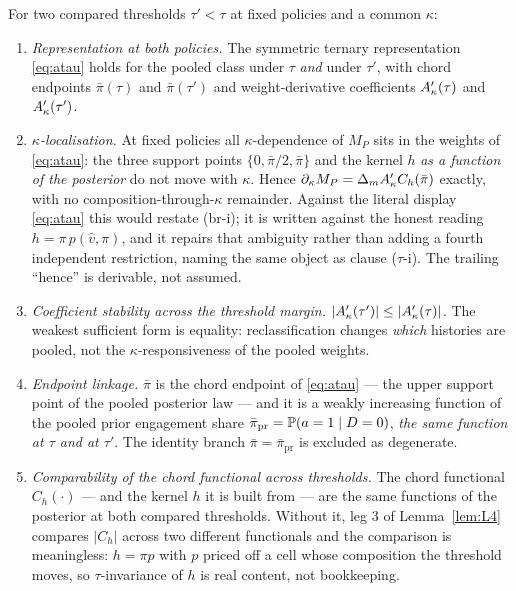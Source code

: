 \begin{assumption}
\label{asm:Abr}
For two compared thresholds $\tau' < \tau$ at fixed policies and a common $\kappa$:
\begin{enumerate}[label=(br-\roman*),leftmargin=3.2em,itemsep=3pt]
\item \emph{Representation at both policies.} The symmetric ternary representation \eqref{eq:atau}
  holds for the pooled class under $\tau$ \emph{and} under $\tau'$, with chord endpoints
  $\bar\pi(\tau)$ and $\bar\pi(\tau')$ and weight-derivative coefficients $A'_{\kappa}(\tau)$ and
  $A'_{\kappa}(\tau')$.
\item \emph{$\kappa$-localisation.} At fixed policies all $\kappa$-dependence of $M_P$ sits in the
  weights of \eqref{eq:atau}: the three support points $\{0,\bar\pi/2,\bar\pi\}$ and the kernel $h$
  \emph{as a function of the posterior} do not move with $\kappa$. Hence
  $\partial_\kappa M_P = \Delta_m A'_{\kappa} C_h(\bar\pi)$ exactly, with no
  composition-through-$\kappa$ remainder. Against the literal display \eqref{eq:atau} this would
  restate (br-i); it is written against the honest reading $h = \pi\,p(\hat v,\pi)$, and it repairs
  that ambiguity rather than adding a fourth independent restriction, naming the same object as
  clause ($\tau$-i). The trailing ``hence'' is derivable, not assumed.
\item \emph{Coefficient stability across the threshold margin.}
  $|A'_{\kappa}(\tau')| \le |A'_{\kappa}(\tau)|$. The weakest sufficient form is equality: reclassification
  changes \emph{which} histories are pooled, not the $\kappa$-responsiveness of the pooled weights.
\item \emph{Endpoint linkage.} $\bar\pi$ is the chord endpoint of \eqref{eq:atau} --- the upper
  support point of the pooled posterior law --- and it is a weakly increasing function of the pooled
  prior engagement share $\bar\pi_{\mathrm{pr}} = \mathbb{P}(a=1 \mid D=0)$, \emph{the same function at
  $\tau$ and at $\tau'$}. The identity branch $\bar\pi = \bar\pi_{\mathrm{pr}}$ is excluded as
  degenerate.
\item \emph{Comparability of the chord functional across thresholds.} The chord functional
  $C_h(\cdot)$ --- and the kernel $h$ it is built from --- are the same functions of the posterior at
  both compared thresholds. Without it, leg 3 of Lemma~\ref{lem:L4} compares $|C_h|$ across two
  different functionals and the comparison is meaningless: $h = \pi p$ with $p$ priced off a cell
  whose composition the threshold moves, so $\tau$-invariance of $h$ is real content, not
  bookkeeping.
\end{enumerate}
\end{assumption}

